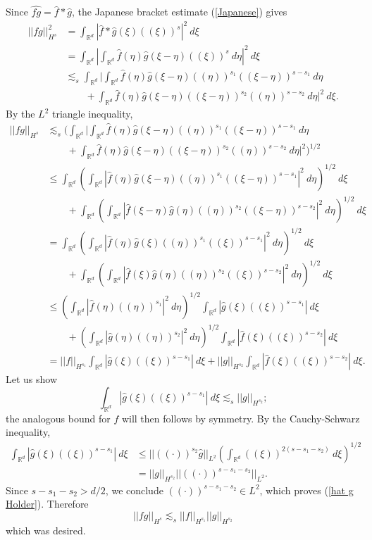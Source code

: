 \documentclass[10pt]{article}
\newcommand{\RR}{\mathbb{R}}
\theoremstyle{definition}
\begin{document}
Since $\widehat{fg} = \hat f * \hat g$, the Japanese bracket estimate (\ref{Japanese}) gives
\begin{align*}||fg||_{H^s}^2 &= \int_{\RR^d} |\hat f * \hat g(\xi) ((\xi))^s|^2 ~d\xi\\
&= \int_{\RR^d} \left|\int_{\RR^d} \hat f(\eta) \hat g(\xi - \eta) ((\xi))^s ~d\eta\right|^2 ~d\xi\\
&\lesssim_s \int_{\RR^d} \bigg|\int_{\RR^d} \hat f(\eta) \hat g(\xi - \eta) ((\eta))^{s_1} ((\xi -\eta))^{s - s_1} ~d\eta \\
&\qquad+\int_{\RR^d} \hat f(\eta) \hat g(\xi - \eta) ((\xi - \eta))^{s_2} ((\eta))^{s - s_2} ~d\eta\bigg|^2 ~d\xi.
\end{align*}
By the $L^2$ triangle inequality,
\begin{align*}||fg||_{H^s} &\lesssim_s \bigg(\int_{\RR^d} \bigg|\int_{\RR^d} \hat f(\eta) \hat g(\xi - \eta) ((\eta))^{s_1} ((\xi -\eta))^{s - s_1} ~d\eta \\
&\qquad+\int_{\RR^d} \hat f(\eta) \hat g(\xi - \eta) ((\xi - \eta))^{s_2} ((\eta))^{s - s_2} ~d\eta\bigg|^2\bigg)^{1/2}\\
&\leq \int_{\RR^d} \left(\int_{\RR^d} |\hat f(\eta) \hat g(\xi - \eta) ((\eta))^{s_1} ((\xi - \eta))^{s - s_1}|^2 ~d\eta\right)^{1/2} ~d\xi\\
&\qquad+\int_{\RR^d} \left(\int_{\RR^d} |\hat f(\xi - \eta) \hat g(\eta) ((\eta))^{s_2} ((\xi - \eta))^{s - s_2}|^2 ~d\eta\right)^{1/2} ~d\xi\\
&= \int_{\RR^d} \left(\int_{\RR^d} |\hat f(\eta) \hat g(\xi) ((\eta))^{s_1} ((\xi))^{s - s_1}|^2 ~d\eta\right)^{1/2} ~d\xi\\
&\qquad+\int_{\RR^d} \left(\int_{\RR^d} |\hat f(\xi) \hat g(\eta) ((\eta))^{s_2} ((\xi))^{s - s_2}|^2 ~d\eta\right)^{1/2} ~d\xi\\
&\leq \left(\int_{\RR^d} |\hat f(\eta) ((\eta))^{s_1}|^2 ~d\eta\right)^{1/2} \int_{\RR^d}  |\hat g(\xi) ((\xi))^{s - s_1}| ~d\xi\\
&\qquad+ \left(\int_{\RR^d} |\hat g(\eta) ((\eta))^{s_2}|^2 ~d\eta\right)^{1/2} \int_{\RR^d} |\hat f(\xi) ((\xi))^{s - s_2}| ~d\xi\\
&= ||f||_{H^{s_1}} \int_{\RR^d} |\hat g(\xi) ((\xi))^{s - s_1}| ~d\xi + ||g||_{H^{s_2}} \int_{\RR^d} |\hat f(\xi) ((\xi))^{s - s_2}| ~d\xi.
\end{align*}
Let us show
\begin{equation}
\label{hat g Holder}
\int_{\RR^d} |\hat g(\xi) ((\xi))^{s - s_1}| ~d\xi \lesssim_s ||g||_{H^{s_2}};
\end{equation}
the analogous bound for $f$ will then follows by symmetry.
By the Cauchy-Schwarz inequality,
\begin{align*}
\int_{\RR^d} |\hat g(\xi) ((\xi))^{s - s_1}| ~d\xi &\leq ||((\cdot))^{s_2}\hat g||_{L^2} \left(\int_{\RR^d} ((\xi))^{2(s - s_1 - s_2)} ~d\xi\right)^{1/2}\\
&= ||g||_{H^{s_2}} ||((\cdot))^{s - s_1 - s_2}||_{L^2}.
\end{align*}
Since $s - s_1 - s_2 > d/2$, we conclude $((\cdot))^{s - s_1 - s_2} \in L^2$, which proves (\ref{hat g Holder}). Therefore
$$||fg||_{H^s} \lesssim_s ||f||_{H^{s_1}} ||g||_{H^{s_2}}$$
which was desired.
\end{document}
